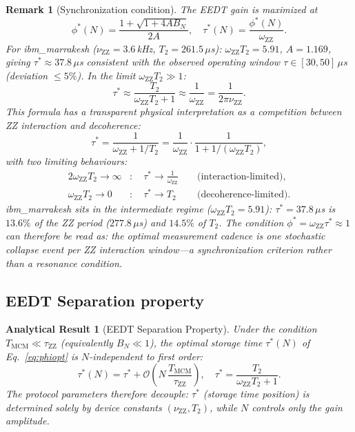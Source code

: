 \documentclass[10pt,twocolumn]{article}
\newtheorem{result}{Analytical Result}
\newtheorem{remark}{Remark}
\newcommand{\nuZZ}{\nu_{\mathrm{ZZ}}}
\newcommand{\oZZ}{\omega_{\mathrm{ZZ}}}
\newcommand{\Tmc}{T_{\mathrm{MCM}}}
\newcommand{\taustar}{\tau^*}
\begin{document}
\begin{remark}[Synchronization condition]
\label{rem:sync}
The EEDT gain is maximized at
\begin{equation}
  \phi^*(N) = \frac{1+\sqrt{1+4AB_N}}{2A}, \quad
  \taustar(N) = \frac{\phi^*(N)}{\oZZ}.
  \label{eq:phiopt}
\end{equation}
For ibm\_marrakesh ($\nuZZ = 3.6$\,kHz, $T_2 = 261.5\,\mu$s):
$\oZZ T_2 = 5.91$, $A = 1.169$, giving $\taustar \approx 37.8\,\mu$s
consistent with the observed operating window $\tau \in [30,50]\,\mu$s
(deviation $\le 5\%$).
In the limit $\oZZ T_2 \gg 1$:
\begin{equation}
  \taustar \approx \frac{T_2}{\oZZ T_2 + 1}
    \approx \frac{1}{\oZZ} = \frac{1}{2\pi\nuZZ}.
  \label{eq:tauapprox}
\end{equation}
This formula has a transparent physical interpretation as a
\emph{competition between ZZ interaction and decoherence}:
\begin{equation}
  \taustar
  = \frac{1}{\oZZ + 1/T_2}
  = \frac{1}{\oZZ}\cdot\frac{1}{1 + 1/(\oZZ T_2)},
  \label{eq:taustar_competition}
\end{equation}
with two limiting behaviours:
\begin{alignat}{2}
  \oZZ T_2 \to \infty &: \quad \taustar \to \frac{1}{\oZZ}
    &&\text{ (interaction-limited)}, \label{eq:limit_strong}\\
  \oZZ T_2 \to 0 &: \quad \taustar \to T_2
    &&\text{ (decoherence-limited)}. \label{eq:limit_weak}
\end{alignat}
ibm\_marrakesh sits in the intermediate regime
($\oZZ T_2 = 5.91$): $\taustar = 37.8\,\mu$s is $13.6\%$ of the
ZZ period ($277.8\,\mu$s) and $14.5\%$ of $T_2$.
The condition $\phi^* = \oZZ\taustar \approx 1$ can therefore be read as:
\emph{the optimal measurement cadence is one stochastic collapse event
per ZZ interaction window}---a synchronization criterion
rather than a resonance condition.
\end{remark}

\subsection{EEDT Separation property}

\begin{result}[EEDT Separation Property]
\label{thm:separation}
Under the condition $\Tmc \ll \tau_\mathrm{ZZ}$ (equivalently $B_N \ll 1$),
the optimal storage time $\taustar(N)$ of Eq.~\eqref{eq:phiopt}
is $N$-independent to first order:
\begin{equation}
  \taustar(N) = \taustar + \mathcal{O}\!\left(N\,\frac{\Tmc}{\tau_\mathrm{ZZ}}\right),
  \quad
  \taustar = \frac{T_2}{\oZZ T_2 + 1}.
  \label{eq:separation}
\end{equation}
The protocol parameters therefore decouple:
$\taustar$ (storage time position) is determined solely by device constants
$(\nuZZ, T_2)$, while $N$ controls only the gain amplitude.
\end{result}
\end{document}
